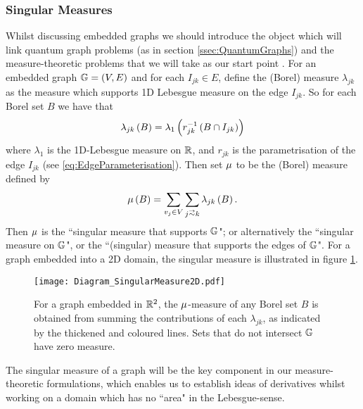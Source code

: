 \subsubsection{Singular Measures} \label{sssec:SingularMeasures}
Whilst discussing embedded graphs we should introduce the object which will link quantum graph problems (as in section \ref{ssec:QuantumGraphs}) and the measure-theoretic problems that we will take as our start point .
For an embedded graph $\mathbb{G} = \left( V,E \right)$ and for each $I_{jk}\in E$, define the (Borel) measure $\lambda_{jk}$ as the measure which supports 1D Lebesgue measure on the edge $I_{jk}$.
So for each Borel set $B$ we have that 
\begin{align*}
	\lambda_{jk}\left( B \right) = \lambda_{1}\left( r_{jk}^{-1}\left( B \cap I_{jk} \right) \right)
\end{align*}
where $\lambda_1$ is the 1D-Lebesgue measure on $\mathbb{R}$, and $r_{jk}$ is the parametrisation of the edge $I_{jk}$ (see \eqref{eq:EdgeParameterisation}).
Then set $\mu$ to be the (Borel) measure defined by
\begin{align*}
	\ddmes\bracs{B} = \sum_{v_j\in V}\sum_{j\conLeft k} \lambda_{jk}\bracs{B}.
\end{align*}
Then $\mu$ is the ``singular measure that supports $\mathbb{G}$"; or alternatively the ``singular measure on $\mathbb{G}$", or the ``(singular) measure that supports the edges of $\mathbb{G}$". 
For a graph embedded into a 2D domain, the singular measure is illustrated in figure \ref{fig:Diagram_SingularMeasure2D}.
\begin{figure}[t!]
	\centering
	\texttt{[image: Diagram\_SingularMeasure2D.pdf]}
	\caption{\label{fig:Diagram_SingularMeasure2D} For a graph embedded in $\mathbb{R}^2$, the $\mu$-measure of any Borel set $B$ is obtained from summing the contributions of each $\lambda_{jk}$, as indicated by the thickened and coloured lines.
	Sets that do not intersect $\mathbb{G}$ have zero measure.}
\end{figure} \newline

The singular measure of a graph will be the key component in our measure-theoretic formulations, which enables us to establish ideas of derivatives whilst working on a domain which has no ``area" in the Lebesgue-sense.

